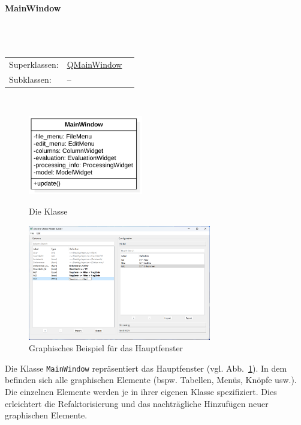 \documentclass{article}
\newcommand{\classheader}[2][]{\paragraph{#2}
\mbox{}\textit{#1}\\\\}
\newcommand{\classref}[1]{\texttt{\nameref{cls:#1}}}
\begin{document}
\classheader{MainWindow}\label{cls:MainWindow}
\begin{tabular}{lll}
 Superklassen: & \href{https://doc.qt.io/qt-6/qmainwindow.html}{QMainWindow}\\
 Subklassen: & --\\
\end{tabular}\\

\begin{figure}[H]%
    \centering
    \begin{minipage}[b]{0.4\textwidth}
        \centering
        \includegraphics[width=5cm]{docs/entwurf/Entwurf_dokument/img/klassenView/MainWindow.png}
        \caption{Die Klasse \classref{MainWindow}}
    \end{minipage}
    \hfill
    \begin{minipage}[b]{0.4\textwidth}
        \includegraphics[width=8cm]{docs/requirements/img/gui-screenshots/columns-editing+model.png}
        \caption{Graphisches Beispiel für das Hauptfenster}
        \label{fig:guiMainWindow}
    \end{minipage}
\end{figure}
Die Klasse \texttt{MainWindow} repräsentiert das Hauptfenster (vgl. Abb.~\ref{fig:guiMainWindow}). In dem befinden sich alle graphischen Elemente (bspw. Tabellen, Menüs, Knöpfe usw.). Die einzelnen Elemente werden je in ihrer eigenen Klasse spezifiziert. Dies erleichtert die Refaktorisierung und das nachträgliche Hinzufügen neuer graphischen Elemente.
\\\\
\end{document}
